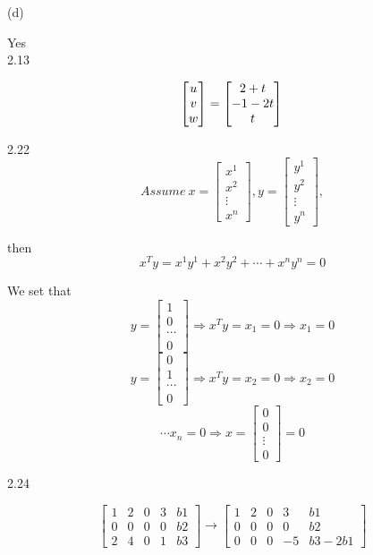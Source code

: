 \documentclass[a4paper,12pt]{article}
\begin{document}
(d)

Yes \\

2.13

\[
\begin{bmatrix} u \\ v \\ w \end{bmatrix} = \begin{bmatrix} 2+t \\ -1-2t \\ t \end{bmatrix} \\
\]

2.22
\[
Assume~x=\begin{bmatrix} x^1 \\ x^2 \\ \vdots \\ x^n \end{bmatrix},
y=\begin{bmatrix} y^1 \\ y^2 \\ \vdots \\ y^n \end{bmatrix},
\]

then
\[
x^Ty=x^1y^1+x^2y^2+\cdots+x^ny^n=0
\]

We set that
\[
y=\begin{bmatrix} 1 \\ 0 \\ \cdots \\ 0 \end{bmatrix} \Rightarrow x^Ty=x_1=0 \Rightarrow x_1=0
\]
\[
y=\begin{bmatrix} 0 \\ 1 \\ \cdots \\ 0 \end{bmatrix} \Rightarrow x^Ty=x_2=0 \Rightarrow x_2=0
\]
\[
\cdots x_n=0 \Rightarrow x=\begin{bmatrix} 0 \\ 0 \\ \vdots \\ 0 \end{bmatrix}=0
\]

2.24

\[
\begin{bmatrix} 1 & 2 & 0 & 3 & b1 \\ 0 & 0 & 0 & 0 & b2 \\ 2 & 4 & 0 & 1 & b3 \end{bmatrix} \rightarrow
\begin{bmatrix} 1 & 2 & 0 & 3 & b1 \\ 0 & 0 & 0 & 0 & b2 \\ 0 & 0 & 0 & -5 & b3-2b1 \end{bmatrix}
\]
\end{document}
